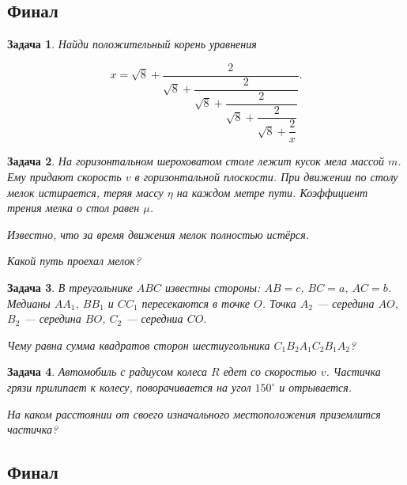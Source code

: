 \documentclass[a4paper, 11pt]{article}
\theoremstyle{break}
\newtheorem{problem}{Задача}[subsection]
\begin{document}
\thispagestyle{empty}
\subsection*{Финал}

\begin{problem}
Найди положительный корень уравнения

\[
x = \sqrt{8} + \dfrac{2}{\sqrt{8} + \dfrac{2}{\sqrt{8} + \dfrac{2}{\sqrt{8} + \dfrac{2}{\sqrt{8} + \dfrac{2}{x}}}}}.
\]

%
%

\end{problem}

\begin{problem}
На горизонтальном шероховатом столе лежит кусок мела массой $m$. Ему
придают скорость $v$ в горизонтальной плоскости.
При движении по столу мелок истирается, теряя массу $\eta$ на каждом метре пути.
Коэффициент трения мелка о стол равен $\mu$.

Известно, что за время движения мелок полностью истёрся.

Какой путь проехал мелок?
\end{problem}


\begin{problem}
В треугольнике $ABC$ известны стороны: $AB=c$, $BC=a$, $AC=b$.
Медианы $AA_1$, $BB_1$ и $CC_1$ пересекаются в точке $O$.
Точка $A_2$ — середина $AO$, $B_2$ — середина $BO$, $C_2$ — середниа $CO$.

Чему равна сумма квадратов сторон шестиугольника $C_1 B_2 A_1 C_2 B_1 A_2$?


\end{problem}



\begin{problem}
Автомобиль с радиусом колеса $R$ едет со скоростью $v$. Частичка грязи прилипает
к колесу, поворачивается на угол $150^{\circ}$ и отрывается.

На каком расстоянии от своего изначального местоположения приземлится частичка?
\end{problem}

\subsection*{Финал}
\setcounter{problem}{0}
\end{document}

